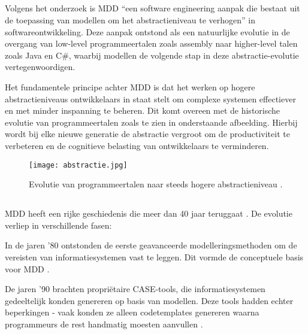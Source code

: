 \subsection{}%

Volgens het onderzoek \textcite{Hailpern2006} is \gls{MDD} “een software engineering aanpak die bestaat uit de toepassing van modellen om het abstractieniveau te verhogen” in softwareontwikkeling. Deze aanpak ontstond als een natuurlijke evolutie in de overgang van low-level programmeertalen zoals assembly naar higher-level talen zoals Java en C\#, waarbij modellen de volgende stap in deze abstractie-evolutie vertegenwoordigen.

Het fundamentele principe achter \gls{MDD} is dat het werken op hogere abstractieniveaus ontwikkelaars in staat stelt om complexe systemen effectiever en met minder inspanning te beheren. Dit komt overeen met de historische evolutie van programmeertalen zoals te zien in onderstaande afbeelding. Hierbij wordt bij elke nieuwe generatie de abstractie vergroot om de productiviteit te verbeteren en de cognitieve belasting van ontwikkelaars te verminderen.

\begin{figure}[H]
    \centering
    \texttt{[image: abstractie.jpg]}
    \caption[Evolution of programming]{\label{fig:evolution} Evolutie van programmeertalen naar steeds hogere abstractieniveau \autocite{Sufi_2023}.}
\end{figure}


\subsection{}%
\gls{MDD} heeft een rijke geschiedenis die meer dan 40 jaar teruggaat \autocite{Henkel2010}. De evolutie verliep in verschillende fasen:

In de jaren '80 ontstonden de eerste geavanceerde modelleringsmethoden om de vereisten van informatiesystemen vast te leggen. Dit vormde de conceptuele basis voor \gls{MDD} \autocite{Henkel2010}.

De jaren '90 brachten propriëtaire \gls{CASE}-tools, die informatiesystemen gedeeltelijk konden genereren op basis van modellen. Deze tools hadden echter beperkingen - vaak konden ze alleen codetemplates genereren waarna programmeurs de rest handmatig moesten aanvullen \autocite{Case_1985}.

